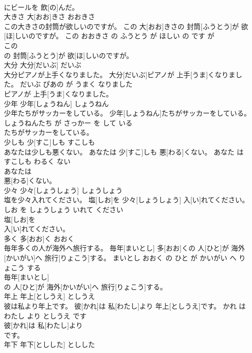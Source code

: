 \documentclass[8pt]{extreport}
\begin{document}
\begin{CJK}{UTF8}{min}
\\	にビールを 飲[の]んだ。			
\\	大きさ	大[おお]きさ	おおきさ	
\\	この大きさの封筒が欲しいのですが。	この 大[おお]きさの 封筒[ふうとう]が 欲[ほ]しいのですが。	この おおきさ の ふうとう が ほしい の です が	
\\	この
\\	の 封筒[ふうとう]が 欲[ほ]しいのですが。			
\\	大分	大分[だいぶ]	だいぶ	
\\	大分ピアノが上手くなりました。	大分[だいぶ]ピアノが 上手[うま]くなりました。	だいぶ ぴあの が うまく なりました	
\\	ピアノが 上手[うま]くなりました。			
\\	少年	少年[しょうねん]	しょうねん	
\\	少年たちがサッカーをしている。	少年[しょうねん]たちがサッカーをしている。	しょうねんたち が さっかー を して いる	
\\	たちがサッカーをしている。			
\\	少しも	少[すこ]しも	すこしも	
\\	あなたは少しも悪くない。	あなたは 少[すこ]しも 悪[わる]くない。	あなた は すこしも わるく ない	
\\	あなたは
\\	悪[わる]くない。			
\\	少々	少々[しょうしょう]	しょうしょう	
\\	塩を少々入れてください。	塩[しお]を 少々[しょうしょう] 入[い]れてください。	しお を しょうしょう いれて ください	
\\	塩[しお]を
\\	入[い]れてください。			
\\	多く	多[おお]く	おおく	
\\	毎年多くの人が海外へ旅行する。	毎年[まいとし] 多[おお]くの 人[ひと]が 海外[かいがい]へ 旅行[りょこう]する。	まいとし おおく の ひと が かいがい へ りょこう する	
\\	毎年[まいとし]
\\	の 人[ひと]が 海外[かいがい]へ 旅行[りょこう]する。			
\\	年上	年上[としうえ]	としうえ	
\\	彼は私より年上です。	彼[かれ]は 私[わたし]より 年上[としうえ]です。	かれ は わたし より としうえ です	
\\	彼[かれ]は 私[わたし]より
\\	です。			
\\	年下	年下[としした]	としした	

\end{CJK}
\end{document}
